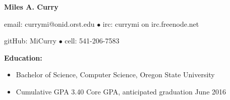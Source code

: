 \documentclass[11pt]{article}
\begin{document}
\centerline{{\LARGE \bf Miles A. Curry}}

\bigskip

\centerline{email: currymi@onid.orst.edu
        $\bullet$
        irc: currymi on irc.freenode.net}
\centerline{gitHub: MiCurry
        $\bullet$
        cell: 541-206-7583}

\bigskip
\hrulefill
\bigskip


\smallskip
\hrulefill
\bigskip

{\Large \bf Education:}
\begin{itemize}
    \setlength{\itemsep}{1pt}
    \setlength{\parskip}{0pt}
    \setlength{\parsep}{0pt}

    \item Bachelor of Science, Computer Science, Oregon State University
    \item Cumulative GPA 3.40 Core GPA, anticipated graduation June 2016

\end{itemize}

\smallskip
\hrulefill
\bigskip
\end{document}
